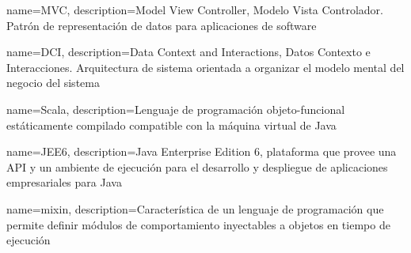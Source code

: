 {
  name=MVC,
  description={Model View Controller, Modelo Vista Controlador. 
    Patr\'on de representaci\'on de datos para aplicaciones de software
  }
}

{
  name=DCI,
  description={Data Context and Interactions, Datos Contexto e Interacciones. 
    Arquitectura de sistema orientada a organizar el modelo mental del negocio del sistema
  }
}

{
  name=Scala,
  description={Lenguaje de programaci\'on objeto-funcional est\'aticamente compilado
    compatible con la m\'aquina virtual de Java}
}

{
  name=JEE6,
  description={Java Enterprise Edition 6, plataforma que provee una API y un ambiente
    de ejecuci\'on para el desarrollo y despliegue de aplicaciones empresariales para 
    Java}
}

{
  name=mixin,
  description={Caracter\'istica de un lenguaje de programaci\'on que permite definir 
  	m\'odulos de comportamiento inyectables a objetos en tiempo de ejecuci\'on}
}
